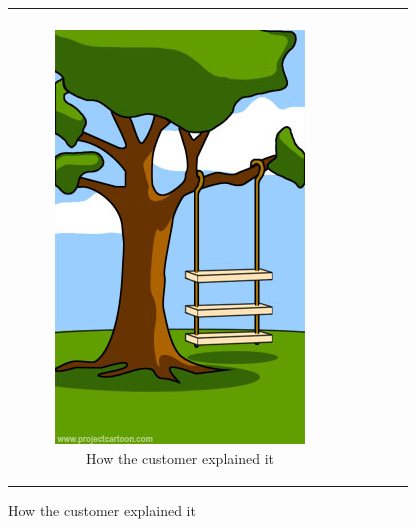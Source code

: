 \documentclass[runningheads,a4paper]{llncs}
\begin{document}
\begin{figure}[h]
\begin{center}
\begin{tabular}{|c|c|c|c|c|}\hline
&&&&\\
\begin{subfigure}[t]{0.15\textwidth}\centering\includegraphics[width=0.9\columnwidth]{images/howexplained}
\caption*{\tiny \centering How the customer explained it}\label{fig:howexplained}\end{subfigure}&

\end{tabular}
\end{center}
\end{figure}
\end{document}
